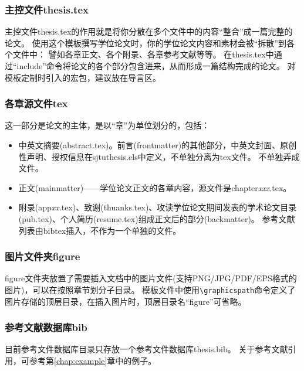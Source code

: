 \subsubsection{主控文件thesis.tex}
\label{sec:thesistex}

主控文件thesis.tex的作用就是将你分散在多个文件中的内容“整合”成一篇完整的论文。
使用这个模板撰写学位论文时，你的学位论文内容和素材会被“拆散”到各个文件中：
譬如各章正文、各个附录、各章参考文献等等。
在thesis.tex中通过“include”命令将论文的各个部分包含进来，从而形成一篇结构完成的论文。
对模板定制时引入的宏包，建议放在导言区。

\subsubsection{各章源文件tex}
\label{sec:thesisbody}

这一部分是论文的主体，是以“章”为单位划分的，包括：

\begin{itemize}[noitemsep,topsep=0pt,parsep=0pt,partopsep=0pt]
	\item 中英文摘要(abstract.tex)。前言(frontmatter)的其他部分，中英文封面、原创性声明、授权信息在sjtuthesis.cls中定义，不单独分离为tex文件。
不单独弄成文件。
	\item 正文(mainmatter)——学位论文正文的各章内容，源文件是chapter\emph{xxx}.tex。
	\item 附录(app\emph{xx}.tex)、致谢(thuanks.tex)、攻读学位论文期间发表的学术论文目录(pub.tex)、个人简历(resume.tex)组成正文后的部分(backmatter)。
参考文献列表由bibtex插入，不作为一个单独的文件。
\end{itemize}

\subsubsection{图片文件夹figure}
\label{sec:fig}

figure文件夹放置了需要插入文档中的图片文件(支持PNG/JPG/PDF/EPS格式的图片)，可以在按照章节划分子目录。
模板文件中使用\verb|\graphicspath|命令定义了图片存储的顶层目录，在插入图片时，顶层目录名“figure”可省略。

\subsubsection{参考文献数据库bib}
\label{sec:bib}

目前参考文件数据库目录只存放一个参考文件数据库thesis.bib。
关于参考文献引用，可参考第\ref{chap:example}章中的例子。

